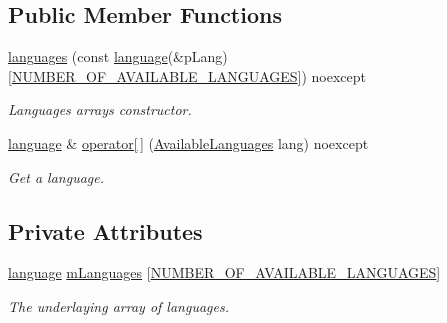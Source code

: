 \subsection*{Public Member Functions}
\begin{DoxyCompactItemize}
\item 
\mbox{\hyperlink{classgame_1_1languages_ac4910ac9ee7bcd69b2e5c2fcc69c25c7}{languages}} (const \mbox{\hyperlink{structgame_1_1languages_1_1language}{language}}(\&p\+Lang)\mbox{[}\mbox{\hyperlink{classgame_1_1languages_ad965ce3a9fdce02ab3caba6301f221ebaf567120d543efe0ddf915638e32eeda2}{N\+U\+M\+B\+E\+R\+\_\+\+O\+F\+\_\+\+A\+V\+A\+I\+L\+A\+B\+L\+E\+\_\+\+L\+A\+N\+G\+U\+A\+G\+ES}}\mbox{]}) noexcept
\begin{DoxyCompactList}\small\item\em Languages\textquotesingle{} array\textquotesingle{}s constructor. \end{DoxyCompactList}\item 
\mbox{\hyperlink{structgame_1_1languages_1_1language}{language}} \& \mbox{\hyperlink{classgame_1_1languages_a8f26423a4e6cc1f3a0a6e386d9129a22}{operator\mbox{[}$\,$\mbox{]}}} (\mbox{\hyperlink{classgame_1_1languages_ad965ce3a9fdce02ab3caba6301f221eb}{Available\+Languages}} lang) noexcept
\begin{DoxyCompactList}\small\item\em Get a language. \end{DoxyCompactList}\end{DoxyCompactItemize}
\subsection*{Private Attributes}
\begin{DoxyCompactItemize}
\item 
\mbox{\label{classgame_1_1languages_ac762ffe06e4c151b7774627a889dc304}} 
\mbox{\hyperlink{structgame_1_1languages_1_1language}{language}} \mbox{\hyperlink{classgame_1_1languages_ac762ffe06e4c151b7774627a889dc304}{m\+Languages}} \mbox{[}\mbox{\hyperlink{classgame_1_1languages_ad965ce3a9fdce02ab3caba6301f221ebaf567120d543efe0ddf915638e32eeda2}{N\+U\+M\+B\+E\+R\+\_\+\+O\+F\+\_\+\+A\+V\+A\+I\+L\+A\+B\+L\+E\+\_\+\+L\+A\+N\+G\+U\+A\+G\+ES}}\mbox{]}
\begin{DoxyCompactList}\small\item\em The underlaying array of languages. \end{DoxyCompactList}\end{DoxyCompactItemize}


